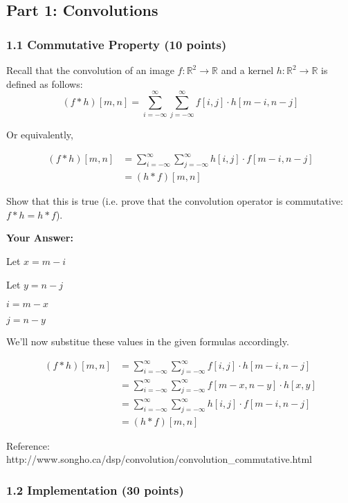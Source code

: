 \documentclass[11pt]{article}
\begin{document}
    \subsection{Part 1: Convolutions}\label{part-1-convolutions}

\subsubsection{1.1 Commutative Property (10
points)}\label{commutative-property-10-points}

Recall that the convolution of an image
\(f:\mathbb{R}^2\rightarrow \mathbb{R}\) and a kernel
\(h:\mathbb{R}^2\rightarrow\mathbb{R}\) is defined as follows:
\[(f*h)[m,n]=\sum_{i=-\infty}^\infty\sum_{j=-\infty}^\infty f[i,j]\cdot h[m-i,n-j]\]

Or equivalently,

\begin{align}
(f*h)[m,n] &= \sum_{i=-\infty}^\infty\sum_{j=-\infty}^\infty h[i,j]\cdot f[m-i,n-j]\\
&= (h*f)[m,n]
\end{align}

Show that this is true (i.e. prove that the convolution operator is
commutative: \(f*h = h*f\)).

    \textbf{Your Answer:}

Let \(x = m - i\)

Let \(y = n -j\)

\(i = m - x\)

\(j = n -y\)

We'll now substitue these values in the given formulas accordingly.

\begin{align*}
(f*h)[m,n] &= \sum_{i=-\infty}^\infty\sum_{j=-\infty}^\infty f[i,j]\cdot h[m-i,n-j]\\
&= \sum_{i=-\infty}^\infty\sum_{j=-\infty}^\infty f[m-x,n-y]\cdot h[x,y]\\
&= \sum_{i=-\infty}^\infty\sum_{j=-\infty}^\infty h[i,j]\cdot f[m-i,n-j]\\
&= (h*f)[m,n]
\end{align*}

Reference:
http://www.songho.ca/dsp/convolution/convolution\_commutative.html

    \subsubsection{1.2 Implementation (30
points)}\label{implementation-30-points}
\end{document}
